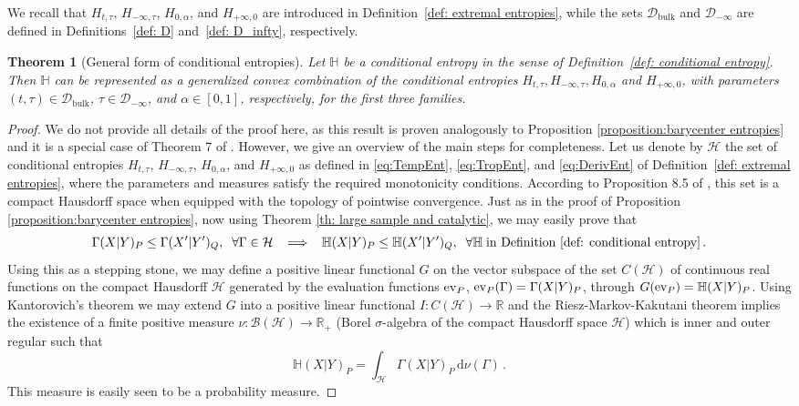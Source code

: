 \documentclass[aps,pra,11pt,onecolumn,nofootinbib,tightenlines]{revtex4-2}
\newtheorem{theorem}{Theorem}[section]
\theoremstyle{definition}
\renewcommand{\H}{\mathbb{H}}
\newcommand{\R}{\mathbb{R}}
\newcommand{\mc}[1]{\mathcal{#1}}
\newcommand{\mb}[1]{\mathbb{#1}}
\begin{document}
We recall that $H_{t,\tau}$, $H_{-\infty,\tau}$, $H_{0,\alpha}$, and $H_{+\infty,0}$ are introduced in Definition~\ref{def: extremal entropies}, while the sets $\mathcal{D}_{\mathrm{bulk}}$ and $\mathcal{D}_{-\infty}$ are defined in Definitions~\ref{def: D} and~\ref{def: D_infty}, respectively.
\begin{theorem}[General form of conditional entropies]
\label{th:barycenter conditional entropies}
Let $\H$ be a conditional entropy in the sense of Definition~\ref{def: conditional entropy}.
Then $\H$ can be represented as a generalized convex combination of the conditional entropies $H_{t,\tau}, H_{-\infty,\tau}, H_{0,\alpha}$ and $H_{+\infty,0}$, with parameters $(t,\tau)\in\mathcal{D}_{\mathrm{bulk}}$, $\tau\in\mathcal{D}_{-\infty}$,  and $\alpha\in[0,1]$, respectively, for the first three families.
\end{theorem}
\begin{proof}
We do not provide all details of the proof here, as this result is proven analogously to Proposition \ref{proposition:barycenter entropies} and it is a special case of Theorem 7 of \cite{haapasalo_inprep}. However, we give an overview of the main steps for completeness. Let us denote by $\mc H$ the set of conditional entropies $H_{t,\tau}$, $H_{-\infty,\tau}$, $H_{0,\alpha}$, and $H_{+\infty,0}$ as defined in \eqref{eq:TempEnt}, \eqref{eq:TropEnt}, and \eqref{eq:DerivEnt} of Definition~\ref{def: extremal entropies}, where the parameters and measures satisfy the required monotonicity conditions. According to Proposition 8.5 of \cite{fritz2023abstractII}, this set is a compact Hausdorff space when equipped with the topology of pointwise convergence. Just as in the proof of Proposition \ref{proposition:barycenter entropies}, now using Theorem \ref{th: large sample and catalytic}, we may easily prove that
\begin{equation}
\Gamma(X|Y)_P \leq \Gamma(X'|Y')_Q,
\;\; \forall \Gamma \in \mc H \;\; \implies \;\; \H(X|Y)_P \leq \H(X'|Y')_Q, \;\; \forall \H \;\text{in Definition~\ref{def: conditional entropy}} \,.
\end{equation}
Using this as a stepping stone, we may define a positive linear functional $G$ on the vector subspace of the set $C(\mc H)$ of continuous real functions on the compact Hausdorff $\mc H$ generated by the evaluation functions ${\rm ev}_{P}$, ${\rm ev}_P(\Gamma)=\Gamma(X|Y)_P$, through $G({\rm ev}_P)=\mb H(X|Y)_P$. Using Kantorovich's theorem we may extend $G$ into a positive linear functional $I:C(\mc H)\to\R$ and the Riesz-Markov-Kakutani theorem implies the existence of a finite positive measure $\nu:\mc B(\mc H)\to\R_+$ (Borel $\sigma$-algebra of the compact Hausdorff space $\mc H$) which is inner and outer regular such that
\begin{equation}
\mb H(X|Y)_P=\int_{\mc H}\Gamma(X|Y)_P\,\mathrm{d}\nu(\Gamma)\,.
\end{equation}
This measure is easily seen to be a probability measure.
\end{proof}
\end{document}
